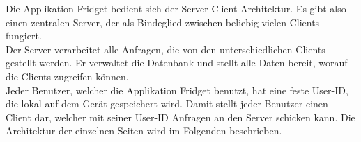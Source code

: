 Die Applikation Fridget bedient sich der Server-Client Architektur. Es gibt also einen zentralen Server, der als Bindeglied zwischen beliebig vielen Clients fungiert. \\
Der Server verarbeitet alle Anfragen, die von den unterschiedlichen Clients gestellt werden. Er verwaltet die Datenbank und stellt alle Daten bereit, worauf die Clients zugreifen können. \\
Jeder Benutzer, welcher die Applikation Fridget benutzt, hat eine feste User-ID, die lokal auf dem Gerät gespeichert wird. Damit stellt jeder Benutzer einen Client dar, welcher mit seiner User-ID Anfragen an den Server schicken kann. 
Die Architektur der einzelnen Seiten wird im Folgenden beschrieben. \\ 
